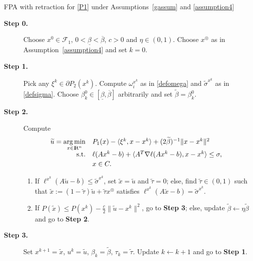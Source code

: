 \documentclass[10pt]{article}
\numberwithin{equation}{section}
\def\R{{\rm I\!R}}
\def\argmin{\mathop{\rm arg\,min}}
\def\xfeasss{x^\circledcirc}
\begin{document}
\begin{algorithm}
\caption{ FPA with retraction for \eqref{P1} under  Assumptions~\ref{gassum} and \ref{assumption4}}\label{SQP_retract2}
\begin{algorithmic}
\STATE
\begin{description}
  \item[\bf Step 0.] Choose $x^0\in \mathcal{F}_1$, $0 < \underline{\beta} < \overline{\beta}$, $c > 0$ and $\eta \in (0, 1)$. Choose $\xfeasss$ as in Assumption~\ref{assumption4} and set $k = 0$.
  \item[\bf Step 1.] Pick any $\xi^k\in \partial P_2(x^k)$. Compute $\omega_i^{x^k}$ as in \eqref{defomega} and $\tilde{\sigma}^{x^k}$ as in \eqref{defsigma}. Choose $\beta_k^0\in[\underline{\beta}, \overline{\beta}]$ arbitrarily and set $\widetilde{\beta} = \beta_k^0$.
  \item[\bf Step 2.] Compute
  \begin{equation}\label{subproblem4}
  \begin{array}{rl}
  \widetilde{u}= \argmin\limits_{x\in\R^n} & P_1(x) - \langle \xi^k, x - x^k\rangle + (2\widetilde{\beta})^{-1}\|x - x^k\|^2\\ [2pt]
      {\rm s.t.}& \ell(Ax^k - b) + \langle A^T\nabla\ell(Ax^k - b), x-x^k\rangle \le \sigma,\\ [2pt]
      & x\in C.
  \end{array}
  \end{equation}
  \begin{enumerate}[\bf {Step 2}a)]
    \item If $\ell^{x^k}(A\widetilde{u} - b) \le \tilde{\sigma}^{x^k}$, set $\widetilde{x}=\widetilde{u}$ and $\widetilde\tau = 0$; else, find $\widetilde{\tau}\in(0,1)$ such that $\widetilde{x}:=(1 - \widetilde{\tau})\widetilde{u} + \widetilde{\tau} \xfeasss$ satisfies $\ell^{x^k}(A\widetilde{x} - b) = \tilde{\sigma}^{x^k}$.
    \item If $P(\widetilde{x}) \leq P(x^k) - \frac{c}{2}\|\widetilde{u} - x^k\|^2$, go to \textbf{Step 3}; else, update $\widetilde{\beta}\leftarrow \eta\widetilde{\beta}$ and go to \textbf{Step 2}.
  \end{enumerate}
  \item[\bf Step 3.] Set $x^{k+1} = \widetilde{x}$, $u^k = \widetilde{u}$, $\beta_k = \widetilde{\beta}$, $\tau_k = \widetilde{\tau}$. Update $k \leftarrow k+1$ and go to \textbf{Step 1}.
\end{description}
\end{algorithmic}
\end{algorithm}
\end{document}
